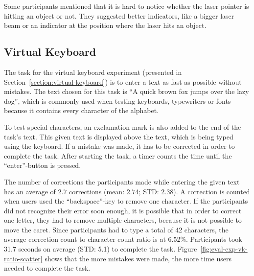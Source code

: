 Some participants mentioned that it is hard to notice whether the laser pointer is hitting an object or not. They suggested better indicators, like a bigger laser beam or an indicator at the position where the laser hits an object.


\subsection{Virtual Keyboard}\label{section:eval-res-vk}

The task for the virtual keyboard experiment (presented in Section~\ref{section:virtual-keyboard}) is to enter a text as fast as possible without mistakes. The text chosen for this task is \enquote{A quick brown fox jumps over the lazy dog}, which is commonly used when testing keyboards, typewriters or fonts because it contains every character of the alphabet.

To test special characters, an exclamation mark is also added to the end of the task's text. This given text is displayed above the text, which is being typed using the keyboard. If a mistake was made, it has to be corrected in order to complete the task. After starting the task, a timer counts the time until the \enquote{enter}-button is pressed.

The number of corrections the participants made while entering the given text has an average of 2.7 corrections (mean: 2.74; \gls{STD}: 2.38). A correction is counted when users used the \enquote{backspace}-key to remove one character. If the participants did not recognize their error soon enough, it is possible that in order to correct one letter, they had to remove multiple characters, because it is not possible to move the caret. Since participants had to type a total of 42 characters, the average correction count to character count ratio is at 6.52\%.
Participants took 31.7 seconds on average (\gls{STD}: 5.1) to complete the task. Figure~\ref{fig:eval-exp-vk-ratio-scatter} shows that the more mistakes were made, the more time users needed to complete the task.

